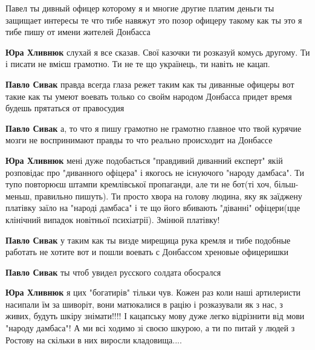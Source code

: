 \begin{itemize}
\begin{itemize}
Павел ты дивный офицер которому я и многие другие платим деньги ты защищает
интересы те что тибе навяжут это позор офицеру такому как ты это я тибе пишу от
имени жителей Донбасса

\textbf{Юра Хливнюк} слухай я все сказав. Свої казочки ти розказуй комусь другому. Ти і писати не вмієш грамотно. Ти не те що українець, ти навіть не кацап.

\textbf{Павло Сивак} правда всегда глаза режет таким как ты диванные офицеры вот такие как ты умеют воевать только со свойм народом Донбасса придет время будешь прятаться от правосудия

\textbf{Павло Сивак} а, то что я пишу грамотно не грамотно главное что твой
курячие мозги не воспринимают правды то что реально происходит на Донбассе


\textbf{Юра Хливнюк} мені дуже подобається "правдивий диванний експерт" якій
розповідає про "диванного офіцера" і якогось не існуючого "народу дамбаса". Ти
тупо повторюєш штампи кремлівської пропаганди, але ти не бот(ті хоч,
більш-меньш, правильно пишуть). Ти просто хвора на голову людина, яку як
заїджену платівку заїло на "народі дамбаса" і те що його вбивають "діванні"
офіцери(цце клінічний випадок новітньої психіатрії). Змінюй платівку!

\textbf{Павло Сивак} у таким как ты визде мирещица рука кремля и тибе подобные работать не хотите вот и пошли воевать с Донбассом хреновые офицеришки

\textbf{Павло Сивак} ты чтоб увидел русского солдата обосрался

\textbf{Юра Хливнюк} я цих "богатирів" тільки чув. Кожен раз коли наші
артилеристи насипали їм за шиворіт, вони матюкалися в рацію і розказували як з
нас, з живих, будуть шкіру знімати!!!! І кацапську мову дуже легко відрізнити
від мови "народу дамбаса"! А ми всі ходимо зі своєю шкурою, а ти по питай у
людей з Ростову на скільки в них виросли кладовища....


\end{itemize}
\end{itemize}
